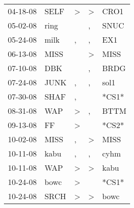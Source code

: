 \begin{supertabular}{p{0.07\textwidth}p{0.06\textwidth}p{0.02\textwidth}p{0.02\textwidth}p{0.06\textwidth}}
          04-18-08\textsuperscript{} &           SELF\textsuperscript{} &     \textgreater &     \textgreater &           CRO1\textsuperscript{} \\
          05-02-08\textsuperscript{} &           ring\textsuperscript{} &                  &                , &           SNUC\textsuperscript{} \\
          05-24-08\textsuperscript{} &           milk\textsuperscript{} &                , &                , &            EX1\textsuperscript{} \\
          06-13-08\textsuperscript{} &           MISS\textsuperscript{} &                  &     \textgreater &           MISS\textsuperscript{} \\
          07-10-08\textsuperscript{} &            DBK\textsuperscript{} &                  &                , &           BRDG\textsuperscript{} \\
          07-24-08\textsuperscript{} &           JUNK\textsuperscript{} &                , &                , &           sol1\textsuperscript{} \\
          07-30-08\textsuperscript{} &           SHAF\textsuperscript{} &                , &                  &                            *CS1* \\
          08-31-08\textsuperscript{} &            WAP\textsuperscript{} &     \textgreater &                , &           BTTM\textsuperscript{} \\
          09-13-08\textsuperscript{} &             FF\textsuperscript{} &     \textgreater &                  &                            *CS2* \\
          10-02-08\textsuperscript{} &           MISS\textsuperscript{} &                , &     \textgreater &           MISS\textsuperscript{} \\
          10-11-08\textsuperscript{} &           kabu\textsuperscript{} &                , &                , &           cyhm\textsuperscript{} \\
          10-11-08\textsuperscript{} &            WAP\textsuperscript{} &     \textgreater &     \textgreater &           kabu\textsuperscript{} \\
          10-24-08\textsuperscript{} &           bowc\textsuperscript{} &     \textgreater &                  &                            *CS1* \\
          10-24-08\textsuperscript{} &           SRCH\textsuperscript{} &     \textgreater &     \textgreater &           bowc\textsuperscript{} \\

\end{supertabular}
